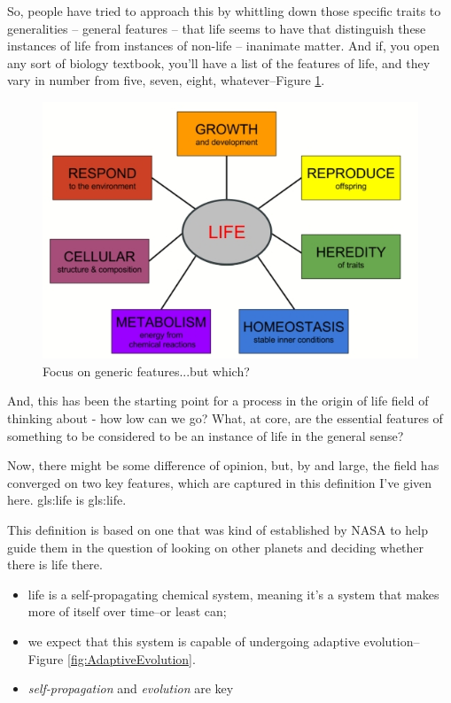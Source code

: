 \documentclass[]{article}
\begin{document}
So, people have tried to approach this by whittling down those specific traits
to generalities -- general features -- that life seems to have
that distinguish these instances of life from instances of non-life --
inanimate matter. And if, you open any sort of biology textbook, you'll have a list of the features of life, and they vary in number from five, seven, eight, whatever--Figure \ref{fig:lawki-focus}.

\begin{figure}[H]
	\caption{Focus on generic features...but which?}\label{fig:lawki-focus} 
	\includegraphics[width=\textwidth]{lawki-focus}
\end{figure}
And, this has been the starting point for a process in the origin of life field of thinking about - how low can we go? 
What, at core, are the essential features of something to be considered to be an instance of life in the general sense?

Now, there might be some difference of opinion, but, by and large, the field has converged on two key features, which are captured in this definition I've given here.
\gls{gls:life} is \glsdesc{gls:life}.

This definition is based on one that was kind of established by NASA to help guide them in the question of looking on other planets and deciding whether there is life there.

\begin{itemize}
	\item life is a self-propagating chemical system, meaning it's a system that makes more of itself over time--or least can;
	\item  we expect  that this system 	is capable of undergoing
	adaptive evolution--Figure \ref{fig:AdaptiveEvolution}.
	\item \emph{self-propagation} and \emph{evolution} are key
\end{itemize}
\end{document}
